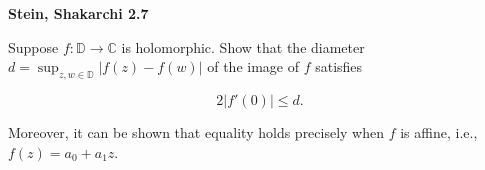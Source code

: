 \textbf{Stein, Shakarchi 2.7}

Suppose $f : \mathbb{D} \to \mathbb{C}$ is holomorphic. Show that the diameter 
$d = \sup_{z,w \in \mathbb{D}} |f(z) - f(w)|$ of the image of $f$ satisfies

$$
2 \left| f'(0) \right| \le d.
$$

Moreover, it can be shown that equality holds precisely when $f$ is affine, i.e., $f(z) = a_0 + a_1 z$.
